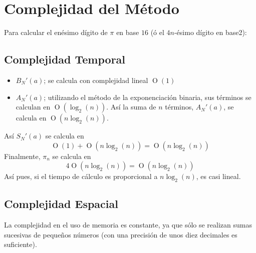
\section{Complejidad del Método}

Para calcular el enésimo dígito de $\pi$ en base $16$ (ó el $4n$-ésimo
dígito en base2):

\subsection*{Complejidad Temporal}

\begin{itemize}
\item $B_{N}'(a)$; se calcula con complejidad lineal
  $\operatorname{O}(1)$
\item $A_{N}'(a)$; utilizando el método de la exponenciación binaria,
  sus términos se calculan en $\operatorname{O}(\log_{2}(n))$. Así la
  suma de $n$ términos, $A_{N}'(a)$, se calcula en
  $\operatorname{O}(n\log_{2}(n))$.
\end{itemize}
Así $S_{N}'(a)$ se calcula en 
\begin{equation*}
  \operatorname{O}(1)+\operatorname{O}(n\log_{2}(n))=
  \operatorname{O}(n\log_{2}(n))
\end{equation*}
Finalmente, $\pi_{n}$ se calcula en
\begin{equation*}
  4\operatorname{O}(n\log_{2}(n))=\operatorname{O}(n\log_{2}(n))    
\end{equation*}
Así pues, si el tiempo de cálculo es proporcional a $n\log_{2}(n)$,
es casi lineal.

\subsection*{Complejidad Espacial}

La complejidad en el uso de memoria es constante, ya que sólo se
realizan sumas sucesivas de pequeños números (con una precisión de
unos diez decimales es suficiente).
